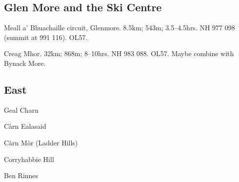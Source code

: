 
\subsection{Glen More and the Ski Centre}

\begin{munros}
\item
Meall a' Bhuachaille circuit, Glenmore.  8.5km; 543m; 3.5--4.5hrs.  NH 977 098
(summit at 991 116).  OL57.

\item\target
Creag Mhor.  32km; 868m; 8--10hrs.  NH 983 088.  OL57.  Maybe combine with
Bynack More.  \tick
\end{munros}


\subsection{East}

Geal Charn

Càrn Ealasaid

Càrn Mòr (Ladder Hills)

Corryhabbie Hill

Ben Rinnes
